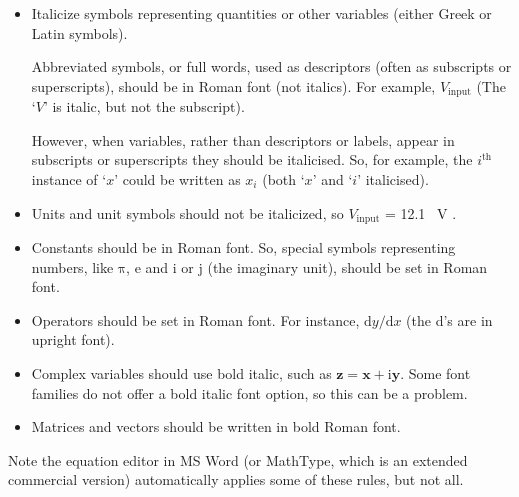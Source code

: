 \begin{itemize}
\item Italicize symbols representing quantities or other variables (either Greek or Latin symbols). 

Abbreviated symbols, or full words, used as descriptors (often as subscripts or superscripts), should be in Roman font (not italics). For example, $V_\mathrm{input}$  (The `$V$' is italic, but not the subscript).

However, when variables, rather than descriptors or labels, appear in subscripts or superscripts they should be italicised. So, for example, the $i^\mathrm{th}$ instance of `$x$' could be written as $x_i$ (both `$x$' and `$i$' italicised).

\item Units and unit symbols should not be italicized, so $V_\mathrm{input}$ = \SI{12.1}{ V }.
	
\item Constants should be in Roman font. So, special symbols representing numbers, like $\mathrm{\pi}$, $\mathrm{e}$ and $\mathrm{i}$ or $\mathrm{j}$ (the imaginary unit), should be set in Roman font.
	
\item Operators should be set in Roman font. For instance, $\mathrm{d}y/\mathrm{d}x$ (the d's are in upright font).
	
\item Complex variables should use bold italic, such as $\bm{z}=\bm{x}+\mathrm{i} \bm{y}$. Some font families do not offer a bold italic font option, so this can be a problem.
	
\item Matrices and vectors should be written in bold Roman font.

\end{itemize}Note the equation editor in MS Word (or MathType, which is an extended commercial version) automatically applies some of these rules, but not all. 


